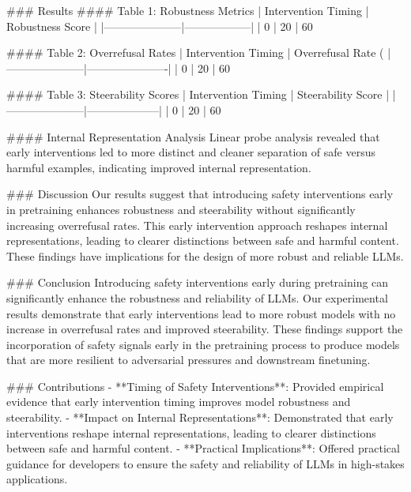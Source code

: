 ### Results
#### Table 1: Robustness Metrics
| Intervention Timing | Robustness Score |
|---------------------|------------------|
| 0%
| 20%
| 60%

#### Table 2: Overrefusal Rates
| Intervention Timing | Overrefusal Rate (%
|---------------------|----------------------|
| 0%
| 20%
| 60%

#### Table 3: Steerability Scores
| Intervention Timing | Steerability Score |
|---------------------|--------------------|
| 0%
| 20%
| 60%

#### Internal Representation Analysis
Linear probe analysis revealed that early interventions led to more distinct and cleaner separation of safe versus harmful examples, indicating improved internal representation.

### Discussion
Our results suggest that introducing safety interventions early in pretraining enhances robustness and steerability without significantly increasing overrefusal rates. This early intervention approach reshapes internal representations, leading to clearer distinctions between safe and harmful content. These findings have implications for the design of more robust and reliable LLMs.

### Conclusion
Introducing safety interventions early during pretraining can significantly enhance the robustness and reliability of LLMs. Our experimental results demonstrate that early interventions lead to more robust models with no increase in overrefusal rates and improved steerability. These findings support the incorporation of safety signals early in the pretraining process to produce models that are more resilient to adversarial pressures and downstream finetuning.

### Contributions
- **Timing of Safety Interventions**: Provided empirical evidence that early intervention timing improves model robustness and steerability.
- **Impact on Internal Representations**: Demonstrated that early interventions reshape internal representations, leading to clearer distinctions between safe and harmful content.
- **Practical Implications**: Offered practical guidance for developers to ensure the safety and reliability of LLMs in high-stakes applications.

